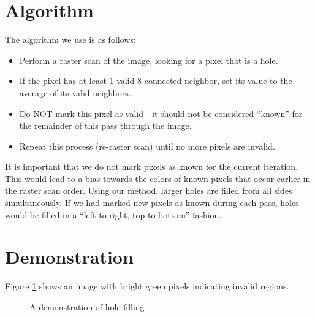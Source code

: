 \documentclass{InsightArticle}
\begin{document}
\section{Algorithm}
The algorithm we use is as follows:
\begin{itemize}
 \item Perform a raster scan of the image, looking for a pixel that is a hole.
 \item If the pixel has at least 1 valid 8-connected neighbor, set its value to the average of its valid neighbors.
 \item Do NOT mark this pixel as valid - it should not be considered ``known'' for the remainder of this pass through the image.
 \item Repeat this process (re-raster scan) until no more pixels are invalid.
\end{itemize}

It is important that we do not mark pixels as known for the current iteration. This would lead to a bias towards the colors of known pixels that occur earlier in the raster scan order. Using our method, larger holes are filled from all sides simultaneously. If we had marked new pixels as known during each pass, holes would be filled in a ``left to right, top to bottom'' fashion.

\section{Demonstration}
Figure \ref{fig:HoleFilling} shows an image with bright green pixels indicating invalid regions.

\begin{figure}[H]
\centering
{}
\caption{A demonstration of hole filling}
\label{fig:HoleFilling}
\end{figure}
\end{document}
